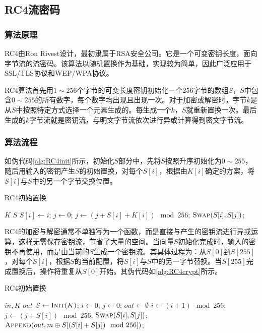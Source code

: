 \documentclass[a4paper, zihao=-4, UTF-8]{ctexart}
\begin{document}
			\subsection{RC4流密码}
				\subsubsection{算法原理}
				RC4由Ron Rivest设计，最初隶属于RSA安全公司。它是一个可变密钥长度，面向字节流的流密码。该算法以随机置换作为基础，实现较为简单，因此广泛应用于SSL/TLS协议和WEP/WPA协议。
				
				RC4算法首先用$1\sim 256$个字节的可变长度密钥初始化一个256字节的数组$S$，$S$中包含$0\sim 255$的所有数字，每个数字均出现且出现一次。对于加密或解密时，字节$k$是从$S$中按照特定方式选择一个元素生成的。每生成一个$k$，$S$就重新置换一次。最后生成的$k$字节流就是密钥流，与明文字节流依次进行异或计算得到密文字节流。
				\subsubsection{算法流程}
				如伪代码\cref{alg:RC4init}所示，初始化$S$部分中，先将$S$按照升序初始化为$0\sim 255$，随后用输入的密钥产生$S$的初始置换，对每个$S[i]$，根据由$K[i]$确定的方案，将$S[i]$与$S$中的另一个字节交换位置。
				\begin{algorithm}[htbp]
					\caption{RC4初始置换}
					\label{alg:RC4init}
					\begin{algorithmic}[1]
						\Require $K$
						\Ensure $S$
							\State $S[i]\gets i$;
						\EndFor
						\State $j\gets 0$;
							\State $j\gets(j+S[i]+K[i])\mod 256$;
							\State $\Call{Swap}{S[i], S[j]}$;
						\EndFor
						\State {}
						\EndFunction
					\end{algorithmic}
				\end{algorithm}
			
				RC4的加密与解密通常不单独写为一个函数，而是直接与产生的密钥流进行异或运算，这样无需保存密钥流，节省了大量的空间。当向量$S$初始化完成时，输入的密钥不再使用，而是由当前的$S$生成一个密钥流。其具体过程为：从$S[0]$到$S[255]$，对每个$S[i]$，根据$S$的当前配置，将$S[i]$与$S$中的另一字节替换。当$S[255]$完成置换后，操作将重复从$S[0]$开始。其伪代码如\cref{alg:RC4crypt}所示。
				
				\begin{algorithm}[htbp]
					\caption{RC4初始置换}
					\label{alg:RC4crypt}
					\begin{algorithmic}[1]
						\Require $in, K$
						\Ensure $out$
						\Function{Crypt}{$in, K$}
						\State $S\gets \Call{Init}{K}$;
						\State $i \gets 0$;
						\State $j \gets 0$;
						\State $out\gets \emptyset$
						\ForAll{$m \in in$}
							\State $i\gets (i+1)\mod 256$;
							\State $j\gets (j+S[i])\mod 256$;
							\State $\Call{Swap}{S[i], S[j]}$;
							\State $\Call{Append}{out, m \oplus S[(S[i] + S[j])\mod 256]}$;
						\EndFor
						\State \Return{$out$}
						\EndFunction
					\end{algorithmic}
				\end{algorithm}
			
\end{document}
